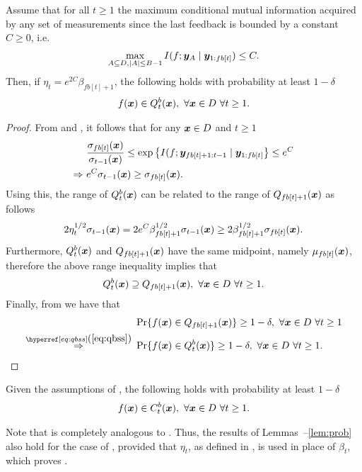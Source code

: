 \begin{lemma}
\label{lem:batch}
Assume that for all $t \geq 1$ the maximum conditional mutual information
acquired by any set of measurements since the last feedback is bounded
by a constant $C \geq 0$, i.e.
\begin{align}
\label{eq:cmi}
\max_{A\subseteq D, |A|\leq B-1} I(f; \bm{y}_A \mid \bm{y}_{1:fb[t]}) \leq C.
\end{align}
Then, if $\eta_t = e^{2C}\beta_{fb[t]+1}$, the following holds with probability
at least $1 - \delta$
\begin{align*}
f(\bm{x}) \in Q_t^{b}(\bm{x}),\ \forall \bm{x} \in D\ \forall t \geq 1.
\end{align*}
\end{lemma}
\begin{proof}
From  and , it follows that for any
$\bm{x} \in D$ and $t \geq 1$
\begin{align*}
&\frac{\sigma_{fb[t]}(\bm{x})}{\sigma_{t-1}(\bm{x})} \leq \exp\left\{I(f; \bm{y}_{fb[t]+1:t-1} \mid \bm{y}_{1:fb[t]}\right\} \leq e^C\\
\Rightarrow\ & e^C \sigma_{t-1}(\bm{x}) \geq \sigma_{fb[t]}(\bm{x}).
\end{align*}
Using this, the range of $Q_t^{b}(\bm{x})$ can be related to the range
of $Q_{fb[t]+1}(\bm{x})$ as follows
\begin{align*}
2\eta_t^{1/2}\sigma_{t-1}(\bm{x}) = 2 e^C \beta_{fb[t]+1}^{1/2}\sigma_{t-1}(\bm{x}) \geq 2\beta_{fb[t]+1}^{1/2}\sigma_{fb[t]}(\bm{x}).
\end{align*}
Furthermore, $Q_t^{b}(\bm{x})$ and $Q_{fb[t]+1}(\bm{x})$ have the same midpoint,
namely $\mu_{fb[t]}(\bm{x})$, therefore the above range inequality implies that
\begin{align}
\label{eq:qbss}
Q_t^{b}(\bm{x}) \supseteq Q_{fb[t]+1}(\bm{x}),\ \forall \bm{x} \in D\ \forall t \geq 1.
\end{align}
Finally, from  we have that
\begin{align*}
&\Pr\{f(\*x) \in Q_{fb[t]+1}(\*x)\} \geq 1 - \delta,\ \forall \*x \in D\ \forall t \geq 1\\
\stackrel{\eqtref{eq:qbss}}{\Rightarrow}\ & \Pr\{f(\*x) \in Q_t^{b}(\*x)\} \geq 1 - \delta,\ \forall \*x \in D\ \forall t \geq 1.
\end{align*}
\end{proof}

\begin{cor}
\label{cor:batch}
Given the assumptions of , the following holds with
probability at least $1-\delta$
\begin{align*}
f(\bm{x}) \in C_t^{b}(\bm{x}),\ \forall \bm{x} \in D\ \forall t \geq 1.
\end{align*}
\end{cor}

\noindent Note that  is completely analogous to .
Thus, the results of Lemmas~--\ref{lem:prob} also hold for
the case of \bacl, provided that $\eta_t$, as defined in ,
is used in place of $\beta_t$, which proves .
